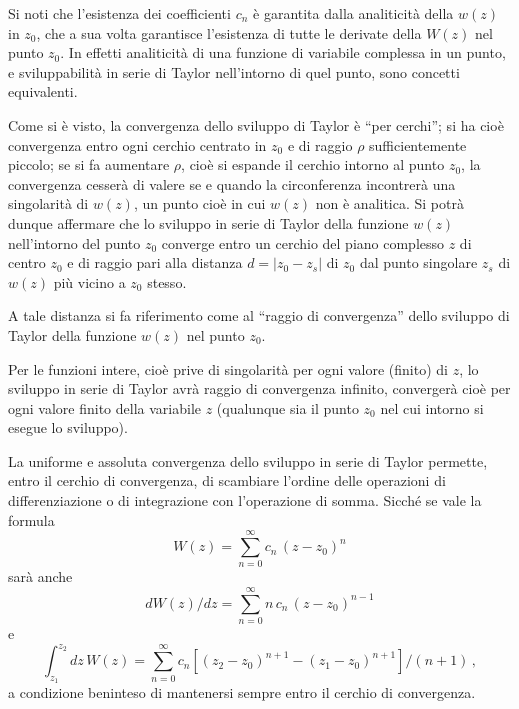 \documentclass[11pt, a4paper]{book}
\numberwithin{equation}{section}
\begin{document}
Si noti che l'esistenza dei coefficienti $c_n$ è garantita dalla analiticità della $w(z)$ in $z_0$, che a sua volta garantisce l'esistenza di tutte le derivate della $W(z)$ nel punto $z_0$. In effetti analiticità di una funzione di variabile complessa in un punto, e sviluppabilità in serie di Taylor nell'intorno di quel punto, sono concetti equivalenti.

Come si è visto, la convergenza dello sviluppo di Taylor è ``per cerchi''; si ha cioè convergenza entro ogni cerchio centrato in $z_0$ e di raggio $\rho$ sufficientemente piccolo; se si fa aumentare $\rho$, cioè si espande il cerchio intorno al punto $z_0$, la convergenza cesserà di valere se e quando la circonferenza incontrerà una singolarità di $w(z)$, un punto cioè in cui $w(z)$ non è analitica. Si potrà dunque affermare che lo sviluppo in serie di Taylor della funzione $w(z)$ nell'intorno del punto $z_0$ converge entro un cerchio del piano complesso $z$ di centro $z_0$ e di raggio pari alla distanza $d = |z_0 - z_s|$ di $z_0$ dal punto singolare $z_s$ di $w(z)$ più vicino a $z_0$ stesso.

A tale distanza si fa riferimento come al ``raggio di convergenza'' dello sviluppo di Taylor della funzione $w(z)$ nel punto $z_0$.

Per le funzioni intere, cioè prive di singolarità per ogni valore (finito) di $z$, lo sviluppo in serie di Taylor avrà raggio di convergenza infinito, convergerà cioè per ogni valore finito della variabile $z$ (qualunque sia il punto $z_0$ nel cui intorno si esegue lo sviluppo).

La uniforme e assoluta convergenza dello sviluppo in serie di Taylor permette, entro il cerchio di convergenza, di scambiare l'ordine delle operazioni di differenziazione o di integrazione con l'operazione di somma. Sicché se vale la formula
\begin{equation}
W(z) = \sum_{n=0}^{\infty} c_n\, (z-z_0)^n \tag{8}
\end{equation}
sarà anche
\begin{equation}
dW(z)/dz = \sum_{n=0}^{\infty} n\, c_n\, (z-z_0)^{n-1} \tag{9}
\end{equation}
e
\begin{equation}
\int_{z_1}^{z_2} dz\, W(z) = \sum_{n=0}^{\infty} c_n \left[(z_2-z_0)^{n+1} - (z_1-z_0)^{n+1}\right]/(n+1)\,, \tag{10}
\end{equation}
a condizione beninteso di mantenersi sempre entro il cerchio di convergenza.
\end{document}
